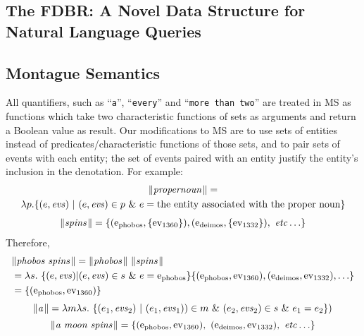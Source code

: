 \documentclass[../main.tex]{subfiles}
\begin{document}
\begin{refsection}
\section{The FDBR: A Novel Data Structure for Natural Language Queries}
\label{webist2019conf:album}

\subsection{Montague Semantics}

All quantifiers, such as ``\texttt{a}'', ``\texttt{every}'' and ``\texttt{more than two}'' are treated in MS as functions which take two characteristic functions of sets as arguments and return a Boolean value as result. Our modifications to MS are to use sets of entities instead of predicates/characteristic functions of those sets, and to pair sets of events with each entity; the set of events paired with an entity justify the entity’s inclusion in the denotation. For example:
\begin{multline*}
	\lVert\textit{propernoun\hspace{0.1em}}\rVert = \\ \lambda p.
	\{(e, \operatorname{\mathit{evs}})\ |\ (e, \operatorname{\mathit{evs}}) \in p\ \&\ e = \text{the entity associated with the proper noun}\}
\end{multline*}
\begin{equation*}
	\begin{split}
		\lVert\textit{spins\hspace{0.1em}}\rVert = \{(\mathrm{e}_{\operatorname{phobos}}, \{\operatorname{ev}_{1360}\}),
		(\mathrm{e}_{\operatorname{deimos}}, \{\operatorname{ev}_{1332}\}),\ \operatorname{\mathit{etc\ldots}}\}
	\end{split}
\end{equation*}
Therefore,
\begin{equation*}
	\begin{split}
		& \lVert\textit{phobos spins\hspace{0.1em}}\rVert = \lVert\textit{phobos\hspace{0.1em}}\rVert\ \lVert\textit{spins\hspace{0.1em}}\rVert \\
		& = \lambda s.\ \{(e, \operatorname{\mathit{evs}}) | (e, \operatorname{\mathit{evs}}) \in s\ \&\ e = \mathrm{e}_{\operatorname{phobos}}\}
		 \{(\mathrm{e}_{\operatorname{phobos}},{\operatorname{ev}_{1360}}), (\mathrm{e}_{\operatorname{deimos}}, \operatorname{ev}_{1332}), \ldots\} \\
		& = \{(\mathrm{e}_{\operatorname{phobos}}, \operatorname{ev}_{1360})\}
	\end{split}
\end{equation*}
\begin{equation*} %
	\meaningof{a} = \lambda m \lambda s.\ \{(e_1,\evs_2)\ |\ (e_1,\evs_1) )\in m\
	\&\ (e_2,\evs_2) \in s\ \&\ e_1 = e_2\})
\end{equation*}
\begin{equation*}
	\lVert\textit{a\ moon\ spins\hspace{0.1em}}\rVert =
	\{(\mathrm{e}_{\operatorname{phobos}}, \operatorname{ev}_{1360}),\ (\mathrm{e}_{\operatorname{deimos}}, \operatorname{ev}_{1332}),\ \operatorname{\mathit{etc\ldots}}\}
\end{equation*}


\end{refsection}
\end{document}
